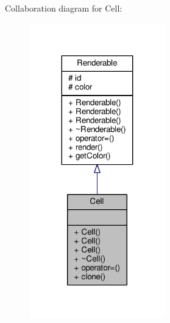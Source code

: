 Collaboration diagram for Cell\+:
\nopagebreak
\begin{figure}[H]
\begin{center}
\leavevmode
\includegraphics[width=167pt]{classCell__coll__graph}
\end{center}
\end{figure}
